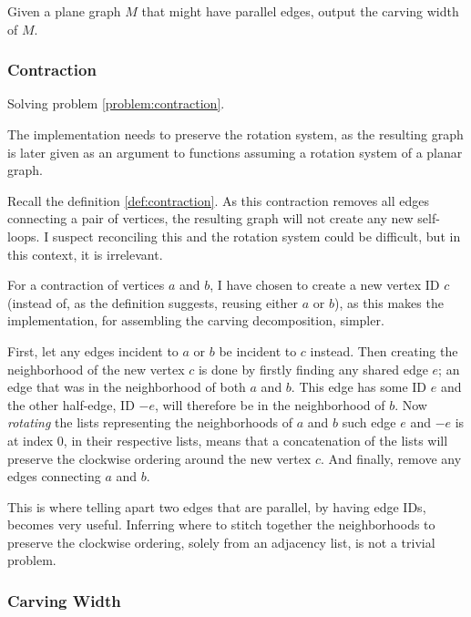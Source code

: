 \documentclass{article}
\begin{document}
		\begin{problem}\label{problem:cw}
			Given a plane graph $M$ that might have parallel edges, output the carving width of $M$.
		\end{problem}

		\subsubsection{Contraction}

			Solving problem \ref{problem:contraction}.

			The implementation needs to preserve the rotation system, as the resulting graph is later given as an argument to functions assuming a rotation system of a planar graph.

			Recall the definition \ref{def:contraction}. As this contraction removes all edges connecting a pair of vertices, the resulting graph will not create any new self-loops. I suspect reconciling this and the rotation system could be difficult, but in this context, it is irrelevant.

			For a contraction of vertices $a$ and $b$, I have chosen to create a new vertex ID $c$ (instead of, as the definition suggests, reusing either $a$ or $b$), as this makes the implementation, for assembling the carving decomposition, simpler.

			First, let any edges incident to $a$ or $b$ be incident to $c$ instead. Then creating the neighborhood of the new vertex $c$ is done by firstly finding any shared edge $e$; an edge that was in the neighborhood of both $a$ and $b$. This edge has some ID $e$ and the other half-edge, ID $-e$, will therefore be in the neighborhood of $b$. Now \textit{rotating} the lists representing the neighborhoods of $a$ and $b$ such edge $e$ and $-e$ is at index 0, in their respective lists, means that a concatenation of the lists will preserve the clockwise ordering around the new vertex $c$. And finally, remove any edges connecting $a$ and $b$.

			This is where telling apart two edges that are parallel, by having edge IDs, becomes very useful. Inferring where to stitch together the neighborhoods to preserve the clockwise ordering, solely from an adjacency list, is not a trivial problem.


		\subsubsection{Carving Width}
\end{document}
